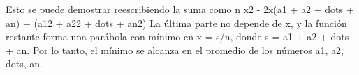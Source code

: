 {}Esto se puede demostrar reescribiendo la suma como\markdownRendererParagraphSeparator
{}\markdownRendererDollarSign{}\markdownRendererDollarSign{}n x\markdownRendererCircumflex{}2 - 2x(a\markdownRendererUnderscore{}1 + a\markdownRendererUnderscore{}2 + \markdownRendererBackslash{}dots + a\markdownRendererUnderscore{}n) + (a\markdownRendererUnderscore{}1\markdownRendererCircumflex{}2 + a\markdownRendererUnderscore{}2\markdownRendererCircumflex{}2 + \markdownRendererBackslash{}dots + a\markdownRendererUnderscore{}n\markdownRendererCircumflex{}2)\markdownRendererDollarSign{}\markdownRendererDollarSign{}\markdownRendererParagraphSeparator
{}La última parte no depende de \markdownRendererDollarSign{}x\markdownRendererDollarSign{}, y la función restante forma una parábola con mínimo en \markdownRendererDollarSign{}x = s/n\markdownRendererDollarSign{}, donde \markdownRendererDollarSign{}s = a\markdownRendererUnderscore{}1 + a\markdownRendererUnderscore{}2 + \markdownRendererBackslash{}dots + a\markdownRendererUnderscore{}n\markdownRendererDollarSign{}. Por lo tanto, el mínimo se alcanza en el promedio de los números \markdownRendererDollarSign{}a\markdownRendererUnderscore{}1, a\markdownRendererUnderscore{}2, \markdownRendererBackslash{}dots, a\markdownRendererUnderscore{}n\markdownRendererDollarSign{}.\markdownRendererInterblockSeparator
{}
\markdownRendererSectionEnd 
\markdownRendererSectionEnd 
\markdownRendererSectionEnd \markdownRendererDocumentEnd